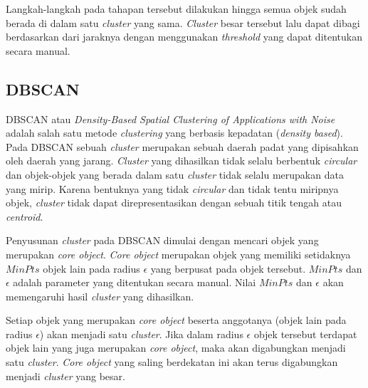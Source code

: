 Langkah-langkah pada tahapan tersebut dilakukan hingga semua objek sudah berada di dalam satu \textit{cluster} yang sama. \textit{Cluster} besar tersebut lalu dapat dibagi berdasarkan dari jaraknya dengan menggunakan \textit{threshold} yang dapat ditentukan secara manual.

\subsection{DBSCAN}
\label{subsec:clustering_dbscan}
DBSCAN atau \textit{Density-Based Spatial Clustering of Applications with Noise} adalah salah satu metode \textit{clustering} yang berbasis kepadatan (\textit{density based}). Pada DBSCAN sebuah \textit{cluster} merupakan sebuah daerah padat yang dipisahkan oleh daerah yang jarang. \textit{Cluster} yang dihasilkan tidak selalu berbentuk \textit{circular} dan objek-objek yang berada dalam satu \textit{cluster} tidak selalu merupakan data yang mirip. Karena bentuknya yang tidak \textit{circular} dan tidak tentu miripnya objek, \textit{cluster} tidak dapat direpresentasikan dengan sebuah titik tengah atau \textit{centroid}.

Penyusunan \textit{cluster} pada DBSCAN dimulai dengan mencari objek yang merupakan \textit{core object}. \textit{Core object} merupakan objek yang memiliki setidaknya $MinPts$ objek lain pada radius $\epsilon$ yang berpusat pada objek tersebut. $MinPts$ dan $\epsilon$ adalah parameter yang ditentukan secara manual. Nilai $MinPts$ dan $\epsilon$ akan memengaruhi hasil \textit{cluster} yang dihasilkan.

Setiap objek yang merupakan \textit{core object} beserta anggotanya (objek lain pada radius $\epsilon$) akan menjadi satu \textit{cluster}. Jika dalam radius $\epsilon$ objek tersebut terdapat objek lain yang juga merupakan \textit{core object}, maka akan digabungkan menjadi satu \textit{cluster}. \textit{Core object} yang saling berdekatan ini akan terus digabungkan menjadi \textit{cluster} yang besar.
